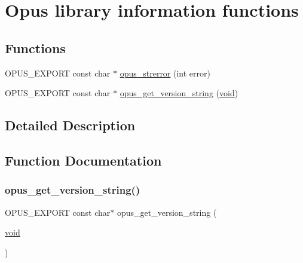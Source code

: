 \hypertarget{group__opus__libinfo}{}\section{Opus library information functions}
\label{group__opus__libinfo}
\subsection*{Functions}
\begin{DoxyCompactItemize}
\item 
O\+P\+U\+S\+\_\+\+E\+X\+P\+O\+RT const char $\ast$ \mbox{\hyperlink{group__opus__libinfo_ga4474c7a5797d39d8a3c3c14f64e9a30f}{opus\+\_\+strerror}} (int error)
\item 
O\+P\+U\+S\+\_\+\+E\+X\+P\+O\+RT const char $\ast$ \mbox{\hyperlink{group__opus__libinfo_gabd0ca7be4a4aa3e71ff7862f2c31866a}{opus\+\_\+get\+\_\+version\+\_\+string}} (\mbox{\hyperlink{_s_d_l__opengles2__gl2ext_8h_ae5d8fa23ad07c48bb609509eae494c95}{void}})
\end{DoxyCompactItemize}


\subsection{Detailed Description}


\subsection{Function Documentation}
\mbox{\label{group__opus__libinfo_gabd0ca7be4a4aa3e71ff7862f2c31866a}} 
\subsubsection{\texorpdfstring{opus\_get\_version\_string()}{opus\_get\_version\_string()}}
{\footnotesize\ttfamily O\+P\+U\+S\+\_\+\+E\+X\+P\+O\+RT const char$\ast$ opus\+\_\+get\+\_\+version\+\_\+string (\begin{DoxyParamCaption}\item[{\mbox{\hyperlink{_s_d_l__opengles2__gl2ext_8h_ae5d8fa23ad07c48bb609509eae494c95}{void}}}]{ }\end{DoxyParamCaption})}

